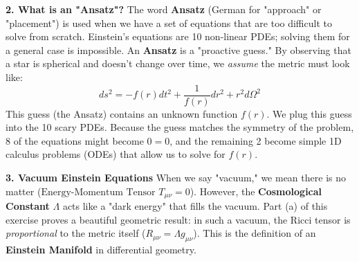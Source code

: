 \begin{solution}
\textbf{2. What is an "Ansatz"?}
The word \textbf{Ansatz} (German for "approach" or "placement") is used when we have a set of equations that are too difficult to solve from scratch. Einstein's equations are 10 non-linear PDEs; solving them for a general case is impossible.
An \textbf{Ansatz} is a "proactive guess." By observing that a star is spherical and doesn't change over time, we \textit{assume} the metric must look like:
\begin{equation*}
    ds^2 = -f(r) dt^2 + \frac{1}{f(r)} dr^2 + r^2 d\Omega^2
\end{equation*}
This guess (the Ansatz) contains an unknown function $f(r)$. We plug this guess into the 10 scary PDEs. Because the guess matches the symmetry of the problem, 8 of the equations might become $0=0$, and the remaining 2 become simple 1D calculus problems (ODEs) that allow us to solve for $f(r)$.

\textbf{3. Vacuum Einstein Equations}
When we say "vacuum," we mean there is no matter ($\text{Energy-Momentum Tensor } T_{\mu\nu} = 0$). However, the \textbf{Cosmological Constant} $\Lambda$ acts like a "dark energy" that fills the vacuum. Part (a) of this exercise proves a beautiful geometric result: in such a vacuum, the Ricci tensor is \textit{proportional} to the metric itself ($R_{\mu\nu} = \Lambda g_{\mu\nu}$). This is the definition of an \textbf{Einstein Manifold} in differential geometry.


\end{solution}
